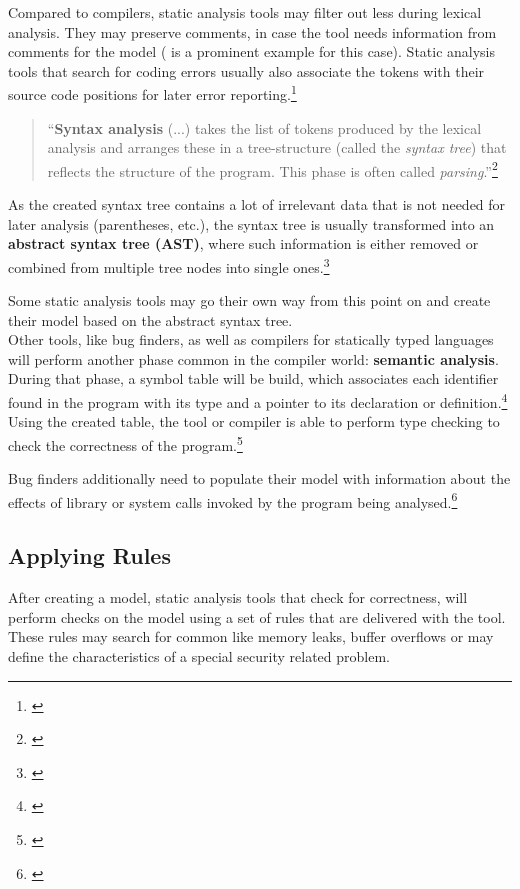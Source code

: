 Compared to compilers, static analysis tools may filter out less during lexical analysis. They may preserve comments, in case the tool needs information from comments for the model ( is a prominent example for this case).
Static analysis tools that search for coding errors usually also associate the tokens with their source code positions for later error reporting.\footnote{\citep[72]{SecureProgramming}} 

\begin{quotation}
``\textbf{Syntax analysis} (...) takes the list of tokens produced by the lexical analysis and arranges these in a tree-structure (called the \textit{syntax tree}) that reflects the structure of the program. This phase is often called \textit{parsing}.''\footnote{\citep[2]{CompilerBasics}}
\end{quotation}

As the created syntax tree contains a lot of irrelevant data that is not needed for later analysis (parentheses, etc.), the syntax tree is usually transformed into an \textbf{abstract syntax tree (AST)}, where such information is either removed or combined from multiple tree nodes into single ones.\footnote{\citep[99]{CompilerBasics}}

Some static analysis tools may go their own way from this point on and create their model based on the abstract syntax tree.\\Other tools, like bug finders, as well as compilers for statically typed languages will perform another phase common in the compiler world: \textbf{semantic analysis}. During that phase, a symbol table will be build, which associates each identifier found in the program with its type and a pointer to its declaration or definition.\footnote{\citep[76]{SecureProgramming}} Using the created table, the tool or compiler is able to perform type checking to check the correctness of the program.\footnote{\citep[76]{SecureProgramming}}

Bug finders additionally need to populate their model with information about the effects of library or system calls invoked by the program being analysed.\footnote{\citep[37]{SecureProgramming}}

\subsection{Applying Rules}

After creating a model, static analysis tools that check for correctness, will perform checks on the model using a set of rules that are delivered with the tool. These rules may search for common  like memory leaks, buffer overflows or may define the characteristics of a special security related problem.

